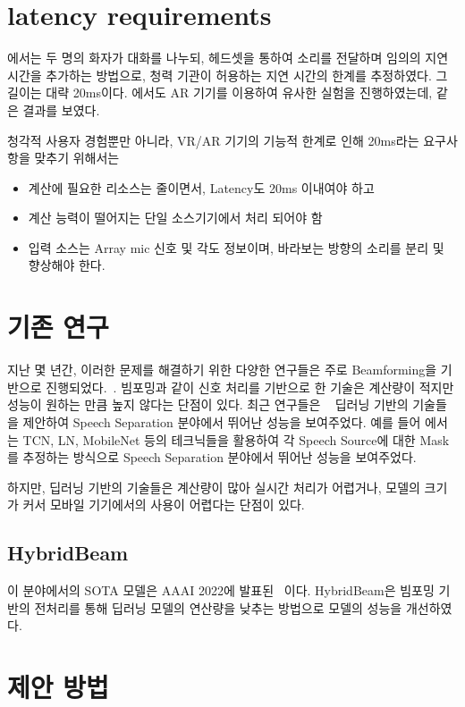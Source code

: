 \documentclass[
	9pt,
	a4paper,
	figtabcapt,
]{oblivoir}
\begin{document}
\section{latency requirements} \label{sec:latency}
\cite{stone1999tolerable}에서는 두 명의 화자가 대화를 나누되, 헤드셋을 통하여 소리를 전달하며 임의의 지연 시간을 추가하는 방법으로, 청력 기관이 허용하는 지연 시간의 한계를 추정하였다.
그 길이는 대략 20ms이다.
\cite{gupta2020acoustic} 에서도 AR 기기를 이용하여 유사한 실험을 진행하였는데, 같은 결과를 보였다.

청각적 사용자 경험뿐만 아니라, VR/AR 기기의 기능적 한계로 인해 20ms라는 요구사항을 맞추기 위해서는
\begin{itemize}
	\item 계산에 필요한 리소스는 줄이면서, Latency도 20ms 이내여야 하고
	\item 계산 능력이 떨어지는 단일 소스기기에서 처리 되어야 함
	\item 입력 소스는 Array mic 신호 및 각도 정보이며, 바라보는 방향의 소리를 분리 및 향상해야 한다.
\end{itemize}

\section{기존 연구} \label{sec:related}
지난 몇 년간, 이러한 문제를 해결하기 위한 다양한 연구들은 주로 Beamforming을 기반으로 진행되었다.~\cite{krim1996two, brayda2015spatially, chhetri2018multichannel}.
빔포밍과 같이 신호 처리를 기반으로 한 기술은 계산량이 적지만 성능이 원하는 만큼 높지 않다는 단점이 있다.
최근 연구들은 ~\cite{luo2019conv,jenrungrot2020cone} 딥러닝 기반의 기술들을 제안하여 Speech Separation 분야에서 뛰어난 성능을 보여주었다.
예를 들어 \cite[convTasNet]{luo2019conv}에서는 TCN, LN, MobileNet 등의 테크닉들을 활용하여 각 Speech Source에 대한 Mask를 추정하는 방식으로
Speech Separation 분야에서 뛰어난 성능을 보여주었다.

하지만, 딥러닝 기반의 기술들은 계산량이 많아 실시간 처리가 어렵거나, 모델의 크기가 커서 모바일 기기에서의 사용이 어렵다는 단점이 있다.


\subsection{HybridBeam} \label{sec:hybrid}
이 분야에서의 SOTA 모델은 AAAI 2022에 발표된 ~\cite[HybridBeam]{wang2021hybrid}이다.
HybridBeam은 빔포밍 기반의 전처리를 통해 딥러닝 모델의 연산량을 낮추는 방법으로 모델의 성능을 개선하였다.


\section{제안 방법} \label{sec:proposed}



\clearpage

\clearpage
\end{document}
